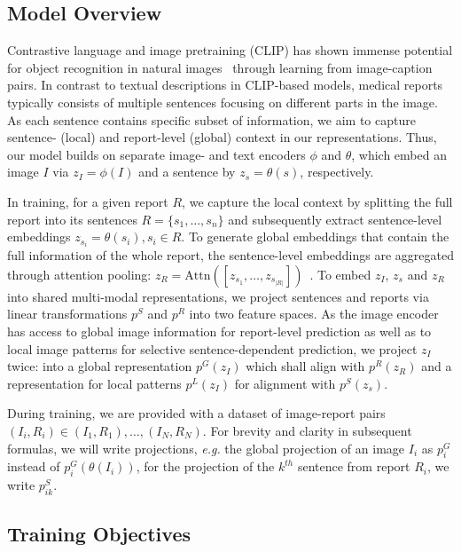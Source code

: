 \documentclass[runningheads]{llncs}
\begin{document}
\subsection{Model Overview}
Contrastive language and image pretraining (CLIP) has shown immense potential for object recognition in natural images~\cite{radford2021learning} through learning from image-caption pairs. In contrast to textual descriptions in CLIP-based models, medical reports typically consists of multiple sentences focusing on different parts in the image. As each sentence contains specific subset of information, we aim to capture sentence- (local) and report-level (global)  context in our representations.
Thus, our model builds on separate image- and text encoders $\phi$ and $\theta$, which embed an image $I$ via $z_I = \phi(I)$ and a sentence by $z_s = \theta(s)$, respectively. 

In training, for a given report $R$, we capture the local context by splitting the full report into its sentences $R = \{s_1,\dots,s_n\}$ and subsequently extract sentence-level embeddings $z_{s_i} = \theta(s_i), s_i \in R$. To generate global embeddings that contain the full information of the whole report, the sentence-level embeddings are aggregated through attention pooling: $z_{R} = \text{Attn}([z_{s_1},\dots,z_{s_{|R|}}])$~\cite{NIPS2017_3f5ee243}.
To embed $z_I$, $z_s$ and $z_R$ into shared multi-modal representations, we project sentences and reports via linear transformations $p^S$ and $p^R$ into two feature spaces.
As the image encoder has access to global image information for report-level prediction as well as to local image patterns for selective sentence-dependent prediction, we project $z_I$ twice: into a global representation $p^{G}(z_I)$ which shall align with $p^R(z_R)$ and a representation for local patterns $p^{L}(z_I)$ for alignment with $p^S(z_s)$. 


During training, we are provided with a dataset of image-report pairs $(I_i, R_i) \in {(I_1, R_1), \dots, (I_N, R_N)}$.
For brevity and clarity in subsequent formulas, we will write projections, \textit{e.g.} the global projection of an image $I_i$ as $p^G_i$ instead of $p^G_i(\theta(I_i))$, for the projection of the $k^{th}$ sentence from report $R_i$, we write $p^S_{ik}$.

\subsection{Training Objectives}
\end{document}
